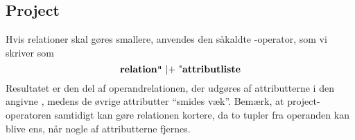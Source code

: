 \documentclass{article}
\newcounter{eks}
\begin{document}
\subsection{Project}
Hvis relationer skal g\o{}res smallere, anvendes den
s\aa{}kaldte {\em {}}-ope\-ra\-tor, som vi skriver som
$$ \mbox{\bf relation} \mbox{\texttt" |+ "} \mbox{\bf attributliste} $$
Resultatet er den del af operandrelationen, der udg\o{}res af attributterne
i den angivne , medens de \o{}vrige attributter
``smides v\ae{}k''. Bem\ae{}rk, at project-operatoren samtidigt kan
g\o{}re relationen kortere, da to tupler fra operanden kan blive ens,
n\aa{}r nogle af attributterne fjernes.

\end{document}
